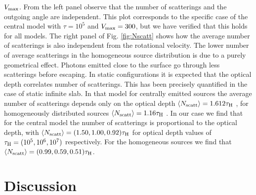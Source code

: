 $V_{\rm max}$.
From the left panel observe that the number of scatterings and the
outgoing angle are independent.
This plot corresponds to the specific case of the central model with
$\tau=10^5$ and $V_{\rm max}=300$\kms, but we have verified that this
holds for all models.
The right panel of Fig. \ref{fig:Nscatt} shows how the average
number of scatterings is also independent from the rotational
velocity.
The lower number of average scatterings in the homogeneous source
distribution is due to a purely geometrical effect.
Photons emitted close to the surface go through less scatterings
before escaping.
In static configurations it is expected that the optical depth correlates number of
scatterings.
This has been precisely quantified in the case of static infinite
slab.
In that model for centrally emitted sources the average number of
scatterings depends only on the optical depth $\langle N_{\rm
scatt}\rangle=1.612\tau_{\rm H}$ \citep{Adams72,Harrington73}, for
homogeneously distributed sources $\langle N_{\rm
scatt}\rangle=1.16\tau_{\rm H}$ \citep{Harrington73}.
In our case we find that for the central model the number of
scatterings is proportional to the optical depth, with $\langle N_{\rm
scatt}\rangle= (1.50, 1.00, 0.92)\tau_{\rm H}$ for optical depth
values of $\tau_{\rm H} = (10^{5}, 10^{6}, 10^{7})$ respectively.
For the homogeneous sources we find that $\langle N_{\rm
scatt}\rangle= (0.99, 0.59, 0.51)\tau_{\rm H}$.
\section{Discussion}
\label{sec:discussion}
